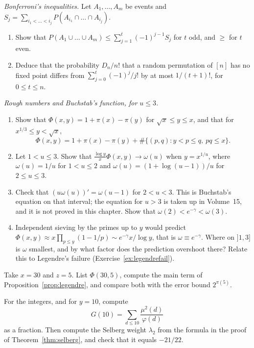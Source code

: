\begin{exercise}[$\star$]\label{pb:bonferroni}
\emph{Bonferroni's inequalities.} Let $A_1,\dots,A_m$ be events and $S_j=\sum_{i_1<\dots<i_j}P(A_{i_1}\cap\dots\cap A_{i_j})$.
\begin{enumerate}[label=(\alph*)]
\item Show that $P(A_1\cup\dots\cup A_m)\le\sum_{j=1}^t(-1)^{j-1}S_j$ for $t$ odd, and $\ge$ for $t$ even.
\item Deduce that the probability $D_n/n!$ that a random permutation of $[n]$ has no fixed point differs from $\sum_{j=0}^t(-1)^j/j!$ by at most $1/(t+1)!$, for $0\le t\le n$.
\end{enumerate}
\end{exercise}

\begin{exercise}[$\star\star\star$]\label{pb:buchstab}
\emph{Rough numbers and Buchstab's function, for $u\le3$.}
\begin{enumerate}[label=(\alph*)]
\item Show that $\Phi(x,y)=1+\pi(x)-\pi(y)$ for $\sqrt x\le y\le x$, and that for $x^{1/3}\le y<\sqrt x$,
\[
\Phi(x,y)=1+\pi(x)-\pi(y)+\#\{(p,q):y<p\le q,\ pq\le x\}.
\]
\item Let $1<u\le3$. Show that $\frac{\log y}x\Phi(x,y)\to\omega(u)$ when $y=x^{1/u}$, where $\omega(u)=1/u$ for $1<u\le2$ and $\omega(u)=(1+\log(u-1))/u$ for $2\le u\le3$.
\item Check that $(u\omega(u))'=\omega(u-1)$ for $2<u<3$. This is Buchstab's equation on that interval; the equation for $u>3$ is taken up in Volume~15, and it is not proved in this chapter. Show that $\omega(2)<e^{-\gamma}<\omega(3)$.
\item Independent sieving by the primes up to $y$ would predict $\Phi(x,y)\approx x\prod_{p\le y}(1-1/p)\sim e^{-\gamma}x/\log y$, that is $\omega\equiv e^{-\gamma}$. Where on $]1,3]$ is $\omega$ smallest, and by what factor does the prediction overshoot there? Relate this to Legendre's failure (Exercise~\ref{ex:legendrefail}).
\end{enumerate}
\end{exercise}

\begin{exercise}[$\star$]\label{ex:sievehand}
Take $x=30$ and $z=5$. List $\Phi(30,5)$, compute the main term of Proposition~\ref{prop:legendre}, and compare both with the error bound $2^{\pi(5)}$.
\end{exercise}

\begin{exercise}[$\star\star$]\label{ex:weightten}
For the integers, and for $y=10$, compute
\[
G(10)=\sum_{d\le10}\frac{\mu^2(d)}{\varphi(d)}
\]
as a fraction. Then compute the Selberg weight $\lambda_2$ from the formula in the proof of Theorem~\ref{thm:selberg}, and check that it equals $-21/22$.
\end{exercise}

